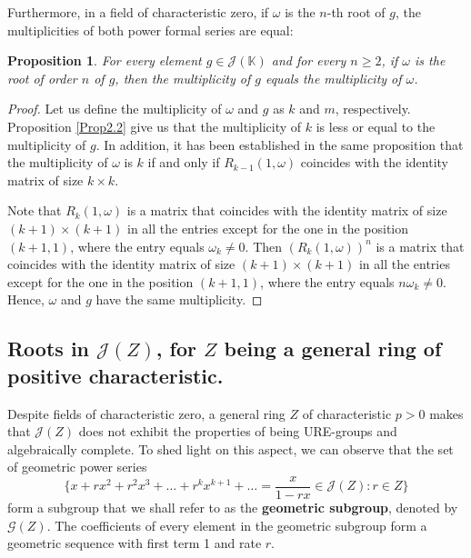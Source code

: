 \documentclass[preprint,12pt]{elsarticle}
\newtheorem{prop}[thm]{Proposition}
\begin{document}
Furthermore, in a field of characteristic zero, if $\omega$ is the $n$-th root of $g$, the multiplicities of both power formal series are equal: 

\begin{prop} For every element $g\in \mathcal J(\mathbb K)$  and for every $n\geq 2$, if $\omega$ is the root of order $n$ of $g$, then 
the multiplicity of $g$ equals the multiplicity of $\omega$.

\end{prop}


\begin{proof} Let us define the multiplicity of $\omega$ and $g$ as $k$ and $m$, respectively. Proposition \ref{Prop2.2} give us that the multiplicity of $k$ is less or equal to the multiplicity of $g$. In addition, it has been established in the same proposition that the multiplicity of $\omega$ is $k$ if and only if $R_{k-1}(1,\omega)$ coincides with the identity matrix of size $k \times k$.

Note that $R_k(1,\omega)$ is a matrix that coincides with the identity matrix of size $(k+1)\times(k+1)$ in all the entries except for the one in the position $(k+1,1)$, where the entry equals $\omega_k\neq 0$. Then $(R_k(1,\omega))^n$ is a matrix that coincides with the identity matrix of size $(k+1)\times(k+1)$ in all the entries except for the one in the position $(k+1,1)$, where the entry equals $n\omega_k\neq 0$. Hence, $\omega$ and $g$ have the same multiplicity.
\end{proof}


\subsection{Roots in  \texorpdfstring{$\mathcal J(Z)$}{J(Z)}, for \texorpdfstring{$Z$}{J(Z)} being a general ring of positive characteristic.}

\medskip

Despite fields of characteristic zero, a general ring $Z$ of characteristic $p>0$ makes that $\mathcal J(Z)$ does not exhibit the properties of being URE-groups and algebraically complete. To shed light on this aspect, we can observe that the set of geometric power series 
$$\{x + rx^2 + r^2 x^3 + \dots + r^k x^{k+1} + \dots =\frac{x}{1-rx}\in \mathcal J(Z):r\in Z\}$$ form a subgroup that we shall refer to as the \textbf{geometric subgroup}, denoted by $\mathcal G(Z)$. The coefficients of every element in the geometric subgroup form a geometric sequence with first term 1 and rate $r$. 
\end{document}
